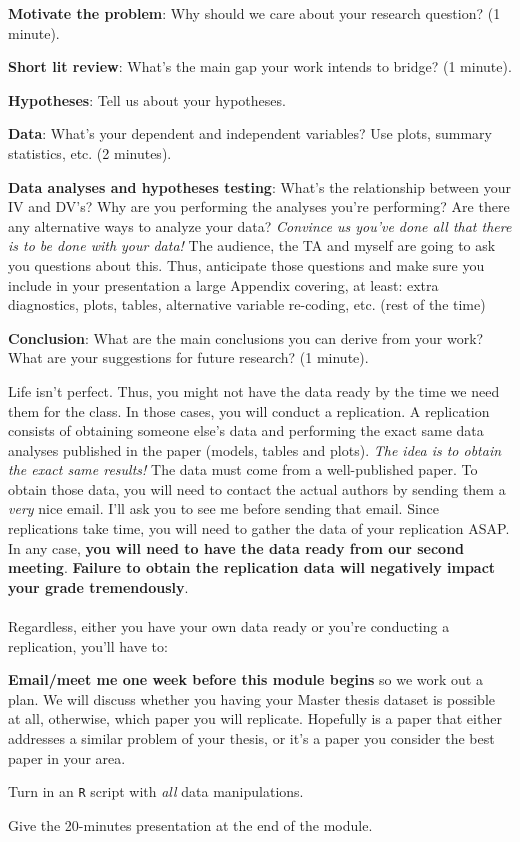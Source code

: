 \documentclass[letterpaper]{article}
\renewenvironment{itemize}{
  \begin{list}{}{
    \setlength{\leftmargin}{1.5em}
  }
}{
  \end{list}
}
\begin{document}
\begin{enumerate}
\begin{itemize}
  \item[$\diamond$] {\bf Motivate the problem}: Why should we care about your research question? (1 minute).
  \item[$\diamond$] {\bf Short lit review}: What's the main gap your work intends to bridge? (1 minute).
  \item[$\diamond$] {\bf Hypotheses}: Tell us about your hypotheses.
  \item[$\diamond$] {\bf Data}: What's your dependent and independent variables? Use plots, summary statistics, etc. (2 minutes).
  \item[$\diamond$] {\bf Data analyses and hypotheses testing}: What's the relationship between your IV and DV's? Why are you performing the analyses you're performing? Are there any alternative ways to analyze your data? \emph{Convince us you've done all that there is to be done with your data!} The audience, the TA and myself are going to ask you questions about this. Thus, anticipate those questions and make sure you include in your presentation a large Appendix covering, at least: extra diagnostics, plots, tables, alternative variable re-coding, etc. (rest of the time)
  \item[$\diamond$] {\bf Conclusion}: What are the main conclusions you can derive from your work? What are your suggestions for future research? (1 minute).
\end{itemize}

Life isn't perfect. Thus, you might not have the data ready by the time we need them for the class. In those cases, you will conduct a replication. A replication consists of obtaining someone else's data and performing the exact same data analyses published in the paper (models, tables and plots). \emph{The idea is to obtain the exact same results!} The data must come from a well-published paper. To obtain those data, you will need to contact the actual authors by sending them a \emph{very} nice email. I'll ask you to see me before sending that email. Since replications take time, you will need to gather the data of your replication ASAP. In any case, {\bf you will need to have the data ready from our second meeting}. {\bf \color{blue}Failure to obtain the replication data will negatively impact your grade tremendously}.
\\
\\
Regardless, either you have your own data ready or you're conducting a replication, you'll have to:

\begin{itemize}
  \item[$\diamond$] {\bf Email/meet me one week before this module begins} so we work out a plan. We will discuss whether you having your Master thesis dataset is possible at all, otherwise, which paper you will replicate. Hopefully is a paper that either addresses a similar problem of your thesis, or it's a paper you consider the best paper in your area. 
  \item[$\diamond$] Turn in an \texttt{R} script with \emph{all} data manipulations.
  \item[$\diamond$] Give the 20-minutes presentation at the end of the module.
\end{itemize}


\end{enumerate}
\end{document}
